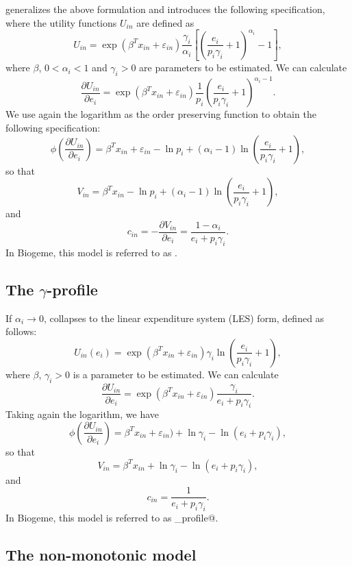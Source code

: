 \documentclass[12pt,a4paper]{article}
\begin{document}
 generalizes the above formulation and introduces the following specification, where the utility functions $U_{in}$ are defined as
\begin{equation}
  \label{eq:generalized_utility}
U_{in} =\exp(\beta^T x_{in} + \varepsilon_{in}) \frac{\gamma_i}{\alpha_i} \left[\left(\frac{e_i}{p_i \gamma_i}+1\right)^{\alpha_i}-1\right],
\end{equation}
where $\beta$, $0 < \alpha_i < 1$ and $\gamma_i > 0$ are parameters to be
estimated. We can calculate
\begin{equation}
  \frac{\partial U_{in}}{\partial e_i} = \exp(\beta^T x_{in} + \varepsilon_{in}) \frac{1}{p_i} \left(\frac{e_i}{p_i \gamma_i}+1\right)^{\alpha_i-1}.
\end{equation}
We use again the logarithm as the order preserving function to obtain the following specification:
\[
\phi\left(\frac{\partial U_{in}}{\partial e_i}\right) = \beta^T x_{in} + \varepsilon_{in} - \ln p_i + (\alpha_i-1) \ln \left(\frac{e_i}{p_i \gamma_i}+1\right),
\]
so that
\[
V_{in} = \beta^T x_{in} - \ln p_i + (\alpha_i-1) \ln \left(\frac{e_i}{p_i \gamma_i}+1\right),
\]
and
\[
c_{in} = -\frac{\partial V_{in}}{\partial e_i} =\frac{1-\alpha_i}{e_i + p_i \gamma_i}.
\]
In Biogeme, this model is referred to as \lstinline@generalized@.

\subsection{The $\gamma$-profile}
If $\alpha_i \to 0$,  collapses to the linear expenditure system (LES) form, defined as follows:
\begin{equation}
  \label{eq:u_les}
U_{in}(e_{i})= \exp(\beta^T x_{in} + \varepsilon_{in}) \gamma_i \ln \left(\frac{e_i}{p_i \gamma_i}+1 \right),
\end{equation}
where $\beta$, $\gamma_i > 0$ is a  parameter to be
estimated. We can calculate
\[
\frac{\partial U_{in}}{\partial e_i} =  \exp(\beta^T x_{in} + \varepsilon_{in}) \frac{\gamma_i}{e_i + p_i \gamma_i}.
\]
Taking again the logarithm, we have
\[
\phi\left(\frac{\partial U_{in}}{\partial e_i}\right) =\beta^T x_{in} + \varepsilon_{in}) + \ln \gamma_i - \ln(e_i + p_i \gamma_i),
\]
so that
\[
V_{in} = \beta^T x_{in} + \ln \gamma_i - \ln(e_i + p_i \gamma_i),
\]
and
\[
c_{in} = \frac{1}{e_i + p_i \gamma_i}.
\]
In Biogeme, this model is referred to as \lstinline@gamma_profile@.

\subsection{The non-monotonic model}
\end{document}
